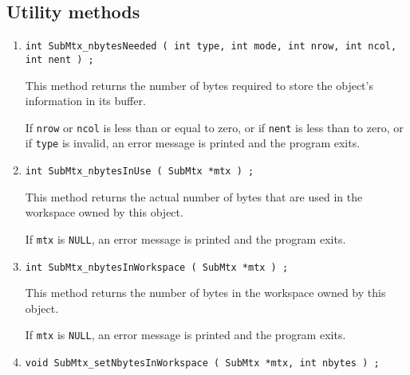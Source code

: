 \subsection{Utility methods}
\label{subsection:SubMtx:proto:utility}
\par
\begin{enumerate}
\item
\begin{verbatim}
int SubMtx_nbytesNeeded ( int type, int mode, int nrow, int ncol, int nent ) ;
\end{verbatim}
\par
This method returns the number of bytes required to store the
object's information in its buffer.
\par {}
If {\tt nrow} or {\tt ncol} is less than or equal to zero,
or if {\tt nent} is less than to zero,
or if {\tt type} is invalid,
an error message is printed and the program exits.
\item
\begin{verbatim}
int SubMtx_nbytesInUse ( SubMtx *mtx ) ;
\end{verbatim}
\par
This method returns the actual number of bytes that are used
in the workspace owned by this object.
\par {}
If {\tt mtx} is {\tt NULL},
an error message is printed and the program exits.
\item
\begin{verbatim}
int SubMtx_nbytesInWorkspace ( SubMtx *mtx ) ;
\end{verbatim}
\par
This method returns the number of bytes in the workspace owned by
this object.
\par {}
If {\tt mtx} is {\tt NULL},
an error message is printed and the program exits.
\item
\begin{verbatim}
void SubMtx_setNbytesInWorkspace ( SubMtx *mtx, int nbytes ) ;

\end{verbatim}
\end{enumerate}
